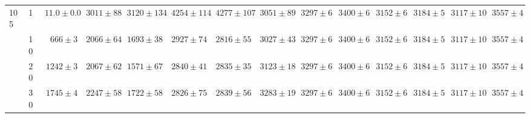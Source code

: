 \begin{table}[!htbp]
{\begin{tabular}{llrrrrrrrrrrrr}
105 & 1 & $11.0{\pm}0.0$ & \cellcolor{green!12}$3011{\pm}88$ & $3120{\pm}134$ & $4254{\pm}114$ & $4277{\pm}107$ & \underline{$3051{\pm}89$} & $3297{\pm}6$ & $3400{\pm}6$ & $3152{\pm}6$ & $3184{\pm}5$ & $3117{\pm}10$ & $3557{\pm}4$ \\
 & 10 & $666{\pm}3$ & \cellcolor{green!12}$2066{\pm}64$ & \cellcolor{green!12}$1693{\pm}38$ & $2927{\pm}74$ & \underline{$2816{\pm}55$} & $3027{\pm}43$ & $3297{\pm}6$ & $3400{\pm}6$ & $3152{\pm}6$ & $3184{\pm}5$ & $3117{\pm}10$ & $3557{\pm}4$ \\
 & 20 & $1242{\pm}3$ & \cellcolor{green!12}$2067{\pm}62$ & \cellcolor{green!12}$1571{\pm}67$ & $2840{\pm}41$ & \underline{$2835{\pm}35$} & $3123{\pm}18$ & $3297{\pm}6$ & $3400{\pm}6$ & $3152{\pm}6$ & $3184{\pm}5$ & $3117{\pm}10$ & $3557{\pm}4$ \\
 & 30 & $1745{\pm}4$ & \cellcolor{green!12}$2247{\pm}58$ & \cellcolor{green!12}$1722{\pm}58$ & \underline{$2826{\pm}75$} & $2839{\pm}56$ & $3283{\pm}19$ & $3297{\pm}6$ & $3400{\pm}6$ & $3152{\pm}6$ & $3184{\pm}5$ & $3117{\pm}10$ & $3557{\pm}4$ \\
\bottomrule
\end{tabular}%
}
\end{table}

